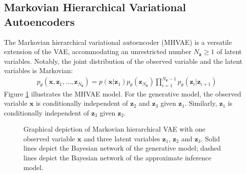\documentclass[ oneside,%
                    author={George Herbert},
                    degree={MSci},
                     title={Video Diffusion Models for Climate Simulations},
                  subtitle={}]{dissertation}
\begin{document}
\subsection{Markovian Hierarchical Variational Autoencoders}
\label{sec:background_vae_hierarchical}

The Markovian hierarchical variational autoencoder (MHVAE) \cite{Improved_Variational_Inference_Kingma,Ladder_VAEs_Sonderby} is a versatile extension of the VAE, accommodating an unrestricted number $N_\mathbf{z}\ge 1$ of latent variables. Notably, the joint distribution of the observed variable and the latent variables is Markovian:
\begin{align}
      p_\theta(\mathbf{x}, \mathbf{z}_1,\ldots,\mathbf{z}_{N_{\mathbf{z}}})=p(\mathbf{x}|\mathbf{z}_1)p_\theta(\mathbf{z}_{N_\mathbf{z}})\prod_{i=1}^{N_{\mathbf{z}}-1}p_\theta(\mathbf{z}_i|\mathbf{z}_{i+1})
\end{align}
Figure \ref{fig:mhvae} illustrates the MHVAE model. For the generative model, the observed variable $\mathbf{x}$ is conditionally independent of $\mathbf{z}_2$ and $\mathbf{z}_3$ given $\mathbf{z}_1$. Similarly, $\mathbf{z}_1$ is conditionally independent of $\mathbf{z}_3$ given $\mathbf{z}_2$.
\begin{figure}[htbp]
      \centering
      \caption{Graphical depiction of Markovian hierarchical VAE with one observed variable $\mathbf{x}$ and three latent variables $\mathbf{z}_1$, $\mathbf{z}_2$ and $\mathbf{z}_3$. Solid lines depict the Bayesian network of the generative model; dashed lines depict the Bayesian network of the approximate inference model.}
      \label{fig:mhvae}
\end{figure}
\end{document}
